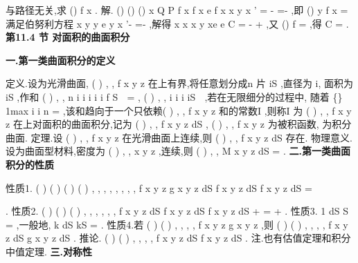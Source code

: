 \int 
与路径无关,求
()
f x . 
解.
()
()
()
x
Q
P
f
x
f x
e f
x
x
y
x
\partial 
\partial 
'
=
\Rightarrow 
-
=-
\partial 
\partial 
,即
()
y
f x
=
满足伯努利方程 
x
y
y
e y
x
'-
=-
,解得
x
x
x
y
xe
e
C
=
-
+
,又
()
f
=
,得
C =
. 
\vspace{6pt}
{\large \bfseries \textcolor{lyred}{第11.4 节 对面积的曲面积分}}

\vspace{4pt}
{\bfseries \textcolor{lyred}{一.第一类曲面积分的定义}}

\textcolor{lyred}{定义}.设\Sigma 为光滑曲面, (
)
, ,
f x y z 在\Sigma 上有界,将\Sigma 任意划分成n 片
iS
\Delta 
,直径为
i\lambda , 
面积为
iS
\Delta 
,作和
(
)
,
,
n
i
i
i
i
i
f
S
\psi \eta 
=
\Delta 
\sum 
,
(
)
,
,
i
i
i
iS
\psi \eta 
\forall 
\in \Delta 
,若在无限细分\Sigma 的过程中,
随着
\{\}
1max
i
i n
\lambda 
\lambda 
\le \le 
=
\to 
,该和趋向于一个只依赖(
)
, ,
f x y z 和\Sigma 的常数I ,则称I 为 
(
)
, ,
f x y z 在\Sigma 上\textcolor{lyred}{对面积的曲面积分},记为
(
)
, ,
f x y z dS
\Sigma \int \int 
,
(
)
, ,
f x y z 为\textcolor{lyred}{被积函数}, 
\Sigma 为\textcolor{lyred}{积分曲面}. 
\textcolor{lyred}{定理}.设
(
)
, ,
f x y z 在光滑曲面\Sigma 上连续,则
(
)
, ,
f x y z dS
\Sigma \int \int 
存在. 
\textcolor{lyred}{物理意义}.设\Sigma 为曲面型材料,密度为
(
)
, ,
x y z
\rho 
,连续,则
(
)
, ,
M
x y z dS
\rho 
\Sigma 
=\int \int 
. 
\vspace{4pt}
{\bfseries \textcolor{lyred}{二.第一类曲面积分的性质}}

\textcolor{lyred}{性质1}.
(
)
(
)
(
)
(
)
, ,
, ,
, ,
, ,
f x y z
g x y z
dS
f x y z dS
f x y z dS
\alpha 
\beta 
\alpha 
\beta 
\Sigma 
\Sigma 
\Sigma 
\pm 
=
\pm 




\int \int 
\int \int 
\int \int 
. 
\textcolor{lyred}{性质2}.
(
)
(
)
(
)
, ,
, ,
, ,
f x y z dS
f x y z dS
f x y z dS
\Sigma +\Sigma 
\Sigma 
\Sigma 
=
+
\int \int 
\int \int 
\int \int 
. 
\textcolor{lyred}{性质3}.
1 dS
S
\Sigma 
\cdots 
=
\int \int 
,一般地,
k dS
kS
\Sigma 
\cdots 
=
\int \int 
. 
\textcolor{lyred}{性质4}.若
(
)
(
)
, ,
, ,
f x y z
g x y z
\le 
,则
(
)
(
)
, ,
, ,
f x y z dS
g x y z dS
\Sigma 
\Sigma 
\le 
\int \int 
\int \int 
. 
\textcolor{lyred}{推论}.
(
)
(
)
, ,
, ,
f x y z dS
f x y z dS
\Sigma 
\Sigma 
\le 
\int \int 
\int \int 
. 
\textcolor{lyred}{注}.也有估值定理和积分中值定理. 
\vspace{4pt}
{\bfseries \textcolor{lyred}{三.对称性}}

